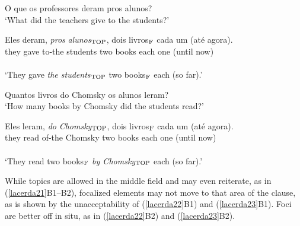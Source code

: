 \documentclass[output=paper]{langscibook}
\begin{document}
\begin{exe}
\ex \label{lacerda19}
\begin{xlist}
 \label{lacerda19a}
O que os professores deram pros alunos?\\
‘What did the teachers give to the students?’

 \label{lacerda19B}
\gll Eles 	deram, 	\emph{pros} 	\emph{alunos$_{\textnormal{TOP}}$}, 	dois 	livros$_{\textnormal{F}}$ 	cada 	um 	(até 	agora).\\
they 	gave 	to-the 	students 	two 	books 	each 	one 	(until 	now)\\\\
‘They gave \emph{the students$_{\textnormal{TOP}}$} two books$_{\textnormal{F}}$ each (so far).’

\end{xlist}

\ex \label{lacerda20}
\begin{xlist}
 \label{lacerda20A}
Quantos livros do Chomsky os alunos leram?\\
‘How many books by Chomsky did the students read?’

 \label{lacerda20B}
\gll Eles 	leram, 	\emph{do} 	\emph{Chomsky}$_{\textnormal{TOP}}$, 	dois 	livros$_{\textnormal{F}}$ 	cada 	um 	(até 	agora).\\
they 	read 	of-the 	Chomsky 	two 	books 	each 	one 	(until 	now)\\\\
‘They read two books$_{\textnormal{F}}$ \emph{by Chomsky$_{\textnormal{TOP}}$} each (so far).’
\end{xlist}

\end{exe}

While topics are allowed in the middle field and may even reiterate, as in (\ref{lacerda21}B1–B2), focalized elements may not move to that area of the clause, as is shown by the unacceptability of (\ref{lacerda22}B1) and (\ref{lacerda23}B1). Foci are better off in situ, as in (\ref{lacerda22}B2) and (\ref{lacerda23}B2).
\end{document}
